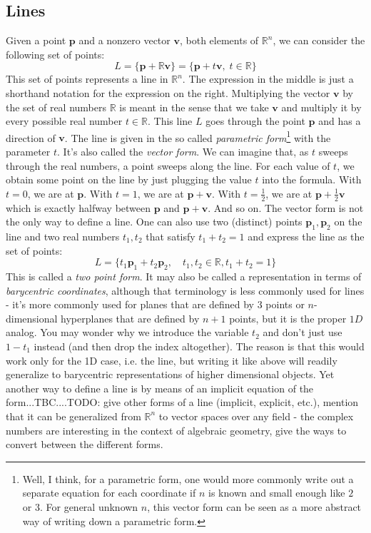 \subsection{Lines}
Given a point $\mathbf{p}$ and a nonzero vector $\mathbf{v}$, both elements of $\mathbb{R}^n$, we can consider the following set of points:
\begin{equation}
 L 
 =
 \{\mathbf{p} + \mathbb{R} \mathbf{v} \} 
 = 
 \{ \mathbf{p} + t \mathbf{v}, \; t \in \mathbb{R} \}
\end{equation}
This set of points represents a line in $\mathbb{R}^n$. The expression in the middle is just a shorthand notation for the expression on the right. Multiplying the vector $\mathbf{v}$ by the set of real numbers $\mathbb{R}$ is meant in the sense that we take $\mathbf{v}$ and multiply it by every possible real number $t \in \mathbb{R}$. This line $L$ goes through the point $\mathbf{p}$ and has a direction of $\mathbf{v}$. The line is given in the so called \emph{parametric form}\footnote{Well, I think, for a parametric form, one would more commonly write out a separate equation for each coordinate if $n$ is known and small enough like $2$ or $3$. For general unknown $n$, this vector form can be seen as a more abstract way of writing down a parametric form.} with the parameter $t$. It's also called the \emph{vector form}. We can imagine that, as $t$ sweeps through the real numbers, a point sweeps along the line. For each value of $t$, we obtain some point on the line by just plugging the value $t$ into the formula. With $t=0$, we are at $\mathbf{p}$. With $t=1$, we are at $\mathbf{p + v}$. With $t=\frac{1}{2}$, we are at $\mathbf{p} + \frac{1}{2} \mathbf{v}$ which is exactly halfway between $\mathbf{p}$ and $\mathbf{p + v}$. And so on. The vector form is not the only way to define a line. One can also use two (distinct) points $\mathbf{p}_1,\mathbf{p}_2$ on the line and two real numbers $t_1, t_2$ that satisfy $t_1 + t_2 = 1$ and express the line as the set of points:
\begin{equation}
 L = \{ t_1 \mathbf{p}_1 + t_2 \mathbf{p}_2,  \quad t_1, t_2 \in \mathbb{R}, t_1 + t_2 = 1 \}
\end{equation}
This is called a \emph{two point form}. It may also be called a representation in terms of \emph{barycentric coordinates}, although that terminology is less commonly used for lines - it's more commonly used for planes that are defined by 3 points or $n$-dimensional hyperplanes that are defined by $n+1$ points, but it is the proper $1D$ analog. You may wonder why we introduce the variable $t_2$ and don't just use $1 - t_1$ instead (and then drop the index altogether). The reason is that this would work only for the 1D case, i.e. the line, but writing it like above will readily generalize to barycentric representations of higher dimensional objects. Yet another way to define a line is by means of an implicit equation of the form...TBC....TODO: give other forms of a line (implicit, explicit, etc.), mention that it can be generalized from $\mathbb{R}^n$ to vector spaces over any field - the complex numbers are interesting in the context of algebraic geometry, give the ways to convert between the different forms.


